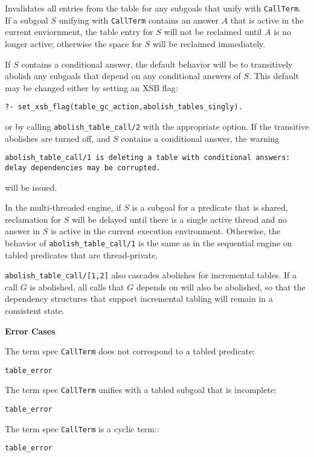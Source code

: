 \begin{description}
\begin{description}
%
Invalidates all entries from the table for any subgoals that unify
with {\tt CallTerm}.  If a subgoal $S$ unifying with {\tt CallTerm}
contains an answer $A$ that is active in the current enviornment, the
table entry for $S$ will not be reclaimed until $A$ is no longer
active; otherwise the space for $S$ will be reclaimed immediately.

If $S$ contains a conditional answer, the default behavior will be to
transitively abolish any subgoals that depend on any conditional
answers of $S$.  This default may be changed either by setting an XSB
flag:
%
\begin{verbatim}
?- set_xsb_flag(table_gc_action,abolish_tables_singly).
\end{verbatim}
% 
or by calling {\tt abolish\_table\_call/2} with the appropriate
option.  If the transitive abolishes are turned off, and $S$ contains
a conditional answer, the warning

{\tt abolish\_table\_call/1 is deleting a table with
  conditional\ answers: \\ delay dependencies may be corrupted.}

will be issued.  

In the multi-threaded engine, if $S$ is a subgoal for a predicate that
is shared, reclamation for $S$ will be delayed until there is a single
active thread and no answer in $S$ is active in the current execution
environment.  Otherwise, the behavior of {\tt abolish\_table\_call/1}
is the same as in the sequential engine on tabled predicates that are
thread-private.

{\tt abolish\_table\_call/[1,2]} also cascades abolishes for
incremental tables.  If a call $G$ is abolished, all calls that $G$
depends on will also be abolished, so that the dependency structures
that support incremental tabling will remain in a consistent state.

{\bf Error Cases}
\bi
\item The term spec {\tt CallTerm} does not correspond to a tabled predicate:
\bi
\item 	{\tt table\_error}
\ei
\item The term spec {\tt CallTerm} unifies with a tabled subgoal that is incomplete:
\bi
\item 	{\tt table\_error}
\ei
\item The term spec {\tt CallTerm} is a cyclic term::
\bi
\item 	{\tt table\_error}
\ei
\ei
%


\end{description}
\end{description}
